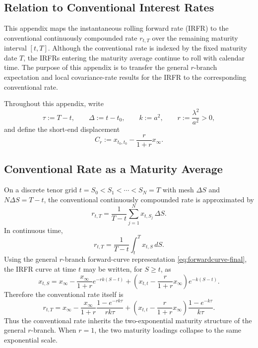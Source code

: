 \documentclass[12pt]{article}
\theoremstyle{statementstyle}
\begin{document}
\begin{appendices}
\section{Relation to Conventional Interest Rates}
\label{appendix:C}

This appendix maps the instantaneous rolling forward rate (IRFR) to the
conventional continuously compounded rate $r_{t,T}$ over the remaining
maturity interval $[t,T]$. Although the conventional rate is indexed by
the fixed maturity date $T$, the IRFRs entering the maturity average
continue to roll with calendar time. The purpose of this appendix is to
transfer the general $r$-branch expectation and local covariance-rate
results for the IRFR to the corresponding conventional rate.

Throughout this appendix, write
\[
\tau:=T-t,
\qquad
\Delta:=t-t_{0},
\qquad
k:=a^{2},
\qquad
r:=\frac{\lambda^{2}}{a^{2}}>0,
\]
and define the short-end displacement
\begin{equation}
C_{r}:=x_{t_{0},t_{0}}-\frac{r}{1+r}x_{\infty}.
\tag{C.0.1}\label{eq:Cr-conventional}
\end{equation}

\subsection{Conventional Rate as a Maturity Average}
\label{appendix:C0}

On a discrete tenor grid $t=S_0<S_1<\cdots<S_N=T$ with mesh $\Delta S$
and $N\Delta S=T-t$, the conventional continuously compounded rate is
approximated by
\[
r_{t,T}
=
\frac{1}{T-t}
\sum_{j=1}^{N}x_{t,S_j}\,\Delta S.
\]
In continuous time,
\begin{equation}
r_{t,T}
=
\frac{1}{T-t}\int_t^T x_{t,S}\,dS.
\tag{C.1.1}\label{eq:conventional-average}
\end{equation}
Using the general $r$-branch forward-curve representation
\eqref{eq:forwardcurve-final}, the IRFR curve at time $t$ may be written,
for $S\ge t$, as
\begin{equation}
x_{t,S}
=
x_{\infty}
-
\frac{x_{\infty}}{1+r}e^{-rk(S-t)}
+
\left(x_{t,t}-\frac{r}{1+r}x_{\infty}\right)e^{-k(S-t)}.
\tag{C.1.2}\label{eq:irfr-curve-for-conventional}
\end{equation}
Therefore the conventional rate itself is
\begin{equation}
r_{t,T}
=
x_{\infty}
-
\frac{x_{\infty}}{1+r}
\frac{1-e^{-rk\tau}}{rk\tau}
+
\left(x_{t,t}-\frac{r}{1+r}x_{\infty}\right)
\frac{1-e^{-k\tau}}{k\tau}.
\tag{C.1.3}\label{eq:conventional-rate-general-r}
\end{equation}
Thus the conventional rate inherits the two-exponential maturity structure
of the general $r$-branch. When $r=1$, the two maturity loadings collapse
to the same exponential scale.


\end{appendices}
\end{document}
